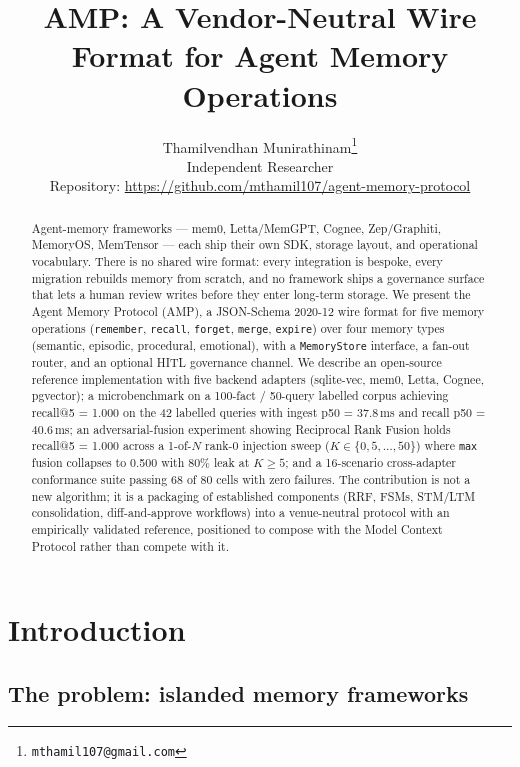 \documentclass[11pt,letterpaper,twocolumn]{article}
\title{AMP: A Vendor-Neutral Wire Format for Agent Memory Operations}
\author{
  Thamilvendhan Munirathinam\thanks{\texttt{mthamil107@gmail.com}}\\
  Independent Researcher\\
  \small{Repository: \url{https://github.com/mthamil107/agent-memory-protocol}}
}
\date{}
\begin{document}
\maketitle

\begin{abstract}
Agent-memory frameworks --- mem0, Letta/MemGPT, Cognee, Zep/Graphiti, MemoryOS, MemTensor --- each ship their own SDK, storage layout, and operational vocabulary. There is no shared wire format: every integration is bespoke, every migration rebuilds memory from scratch, and no framework ships a governance surface that lets a human review writes before they enter long-term storage. We present the Agent Memory Protocol (AMP), a JSON-Schema 2020-12 wire format for five memory operations (\texttt{remember}, \texttt{recall}, \texttt{forget}, \texttt{merge}, \texttt{expire}) over four memory types (semantic, episodic, procedural, emotional), with a \texttt{MemoryStore} interface, a fan-out router, and an optional HITL governance channel. We describe an open-source reference implementation with five backend adapters (sqlite-vec, mem0, Letta, Cognee, pgvector); a microbenchmark on a 100-fact / 50-query labelled corpus achieving recall@5 = 1.000 on the 42 labelled queries with ingest p50 = 37.8\,ms and recall p50 = 40.6\,ms; an adversarial-fusion experiment showing Reciprocal Rank Fusion holds recall@5 = 1.000 across a 1-of-$N$ rank-0 injection sweep ($K \in \{0,5,\dots,50\}$) where \texttt{max} fusion collapses to 0.500 with 80\% leak at $K \geq 5$; and a 16-scenario cross-adapter conformance suite passing 68 of 80 cells with zero failures. The contribution is not a new algorithm; it is a packaging of established components (RRF, FSMs, STM/LTM consolidation, diff-and-approve workflows) into a venue-neutral protocol with an empirically validated reference, positioned to compose with the Model Context Protocol rather than compete with it.
\end{abstract}

\section{Introduction}
\label{sec:intro}

\subsection{The problem: islanded memory frameworks}
\label{sec:intro-problem}
\end{document}
